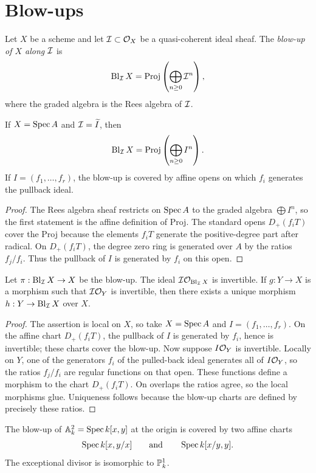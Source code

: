 \section{Blow-ups}

\begin{definition}
Let \(X\) be a scheme and let \(\mathcal{I}\subset\mathcal{O}_X\) be a quasi-coherent ideal
sheaf.  The \emph{blow-up of \(X\) along \(\mathcal{I}\)} is
\[
    \operatorname{Bl}_{\mathcal{I}}X
    =
    \operatorname{Proj}\left(\bigoplus_{n\ge0}\mathcal{I}^n\right),
\]
where the graded algebra is the Rees algebra of \(\mathcal{I}\).
\end{definition}

\begin{proposition}
If \(X=\operatorname{Spec} A\) and \(\mathcal{I}=\widetilde I\), then
\[
    \operatorname{Bl}_{\mathcal{I}}X
    =
    \operatorname{Proj}\left(\bigoplus_{n\ge0}I^n\right).
\]
If \(I=(f_1,\ldots,f_r)\), the blow-up is covered by affine opens on which
\(f_i\) generates the pullback ideal.
\end{proposition}

\begin{proof}
The Rees algebra sheaf restricts on \(\operatorname{Spec} A\) to the graded algebra
\(\bigoplus I^n\), so the first statement is the affine definition of Proj.
The standard opens \(D_+(f_iT)\) cover the Proj because the elements \(f_iT\)
generate the positive-degree part after radical.  On \(D_+(f_iT)\), the degree
zero ring is generated over \(A\) by the ratios \(f_j/f_i\).  Thus the pullback
of \(I\) is generated by \(f_i\) on this open.
\end{proof}

\begin{theorem}
Let \(\pi:\operatorname{Bl}_{\mathcal{I}}X\to X\) be the blow-up.  The ideal
\(\mathcal{I}\mathcal{O}_{\operatorname{Bl}_{\mathcal{I}}X}\) is invertible.  If \(g:Y\to X\) is a
morphism such that \(\mathcal{I}\mathcal{O}_Y\) is invertible, then there exists a unique
morphism \(h:Y\to\operatorname{Bl}_{\mathcal{I}}X\) over \(X\).
\end{theorem}

\begin{proof}
The assertion is local on \(X\), so take \(X=\operatorname{Spec} A\) and \(I=(f_1,\ldots,f_r)\).
On the affine chart \(D_+(f_iT)\), the pullback of \(I\) is generated by
\(f_i\), hence is invertible; these charts cover the blow-up.  Now suppose
\(I\mathcal{O}_Y\) is invertible.  Locally on \(Y\), one of the generators \(f_i\) of
the pulled-back ideal generates all of \(I\mathcal{O}_Y\), so the ratios \(f_j/f_i\)
are regular functions on that open.  These functions define a morphism to the
chart \(D_+(f_iT)\).  On overlaps the ratios agree, so the local morphisms glue.
Uniqueness follows because the blow-up charts are defined by precisely these
ratios.
\end{proof}

\begin{example}
The blow-up of \(\mathbb{A}^2_k=\operatorname{Spec} k[x,y]\) at the origin is covered by two affine
charts
\[
    \operatorname{Spec} k[x,y/x]\qquad\text{and}\qquad \operatorname{Spec} k[x/y,y].
\]
The exceptional divisor is isomorphic to \(\mathbb{P}^1_k\).
\end{example}
